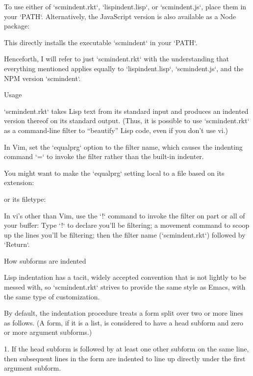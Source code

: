 To use either of `scmindent.rkt`, `lispindent.lisp`, or
`scmindent.js`, place them in your `PATH`. Alternatively,
the JavaScript version is also available as a Node
package:

This directly installs the executable `scmindent` in your `PATH`.

Henceforth, I will refer to just `scmindent.rkt` with the understanding that
everything mentioned applies equally to `lispindent.lisp`,
`scmindent.js`, and the NPM version `scmindent`.

\beginsection Usage

`scmindent.rkt` takes
Lisp text from its standard input and produces an indented version
thereof on its standard output.  (Thus, it is possible to use
`scmindent.rkt` as a command-line filter to “beautify” Lisp code, even if
you don’t use vi.)

In Vim, set the `equalprg` option to the filter name, which causes the
indenting command `=` to invoke the filter rather than the built-in
indenter.

You might want to make the `equalprg` setting local to a file
based on its extension:

or its filetype:

In vi’s other than Vim, use the `!` command to invoke the filter on part or all of
your buffer: Type `!` to declare you’ll be filtering; a movement command
to scoop up the lines you’ll be filtering; then the filter name
(`scmindent.rkt`) followed by `Return`.

\beginsection How subforms are indented

Lisp indentation has a tacit, widely accepted convention that is not
lightly to be messed with, so `scmindent.rkt` strives to provide the same
style as Emacs, with the same type of customization.

By default, the indentation procedure treats
a form split over two or more lines as
follows.  (A form, if it is a list, is considered to have a head subform and zero or
more argument subforms.)

1. If the head subform is followed by at
least one other subform on the same line, then subsequent lines in the
form are indented to line up directly under the first argument subform.


